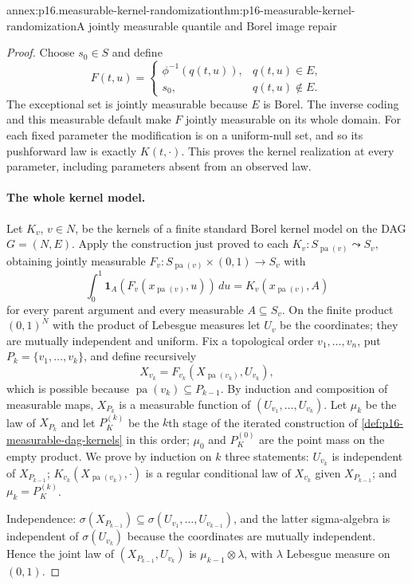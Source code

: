 \begin{annexitem}{annex:p16.measurable-kernel-randomization}{thm:p16-measurable-kernel-randomization}{A jointly measurable quantile and Borel image repair}
\begin{proof}
Choose \(s_0\in S\) and define
\[
 F(t,u)=\begin{cases}\phi^{-1}(q(t,u)),&q(t,u)\in E,\\
                         s_0,&q(t,u)\notin E.\end{cases}
\]
The exceptional set is jointly measurable because \(E\) is Borel.
The inverse coding and this measurable default make \(F\) jointly
measurable on its whole domain. For each fixed parameter the modification
is on a uniform-null set, and so its pushforward law is exactly
\(K(t,\cdot)\). This proves the kernel realization at every parameter,
including parameters absent from an observed law.

\paragraph{The whole kernel model.}
Let \(K_v\), \(v\in N\), be the kernels of a finite standard Borel
kernel model on the DAG \(G=(N,E)\). Apply the construction just
proved to each \(K_v:S_{\operatorname{pa}(v)}\leadsto S_v\), obtaining
jointly measurable \(F_v:S_{\operatorname{pa}(v)}\times(0,1)\to S_v\)
with
\[
 \int_0^1\mathbf 1_A(F_v(x_{\operatorname{pa}(v)},u))\,du
   =K_v(x_{\operatorname{pa}(v)},A)
\]
for every parent argument and every measurable \(A\subseteq S_v\).
On the finite product \((0,1)^N\) with the product of Lebesgue measures
let \(U_v\) be the coordinates; they are mutually independent and
uniform. Fix a topological order \(v_1,\ldots,v_n\), put
\(P_k=\{v_1,\ldots,v_k\}\), and define recursively
\[
 X_{v_k}=F_{v_k}(X_{\operatorname{pa}(v_k)},U_{v_k}),
\]
which is possible because \(\operatorname{pa}(v_k)\subseteq P_{k-1}\).
By induction and composition of measurable maps, \(X_{P_k}\) is a
measurable function of \((U_{v_1},\ldots,U_{v_k})\). Let
\(\mu_k\) be the law of \(X_{P_k}\) and let \(P_K^{(k)}\) be the
\(k\)th stage of the iterated construction of
\cref{def:p16-measurable-dag-kernels} in this order; \(\mu_0\) and
\(P_K^{(0)}\) are the point mass on the empty product. We prove by
induction on \(k\) three statements: \(U_{v_k}\) is independent of
\(X_{P_{k-1}}\); \(K_{v_k}(X_{\operatorname{pa}(v_k)},\cdot)\) is a
regular conditional law of \(X_{v_k}\) given \(X_{P_{k-1}}\); and
\(\mu_k=P_K^{(k)}\).

Independence: \(\sigma(X_{P_{k-1}})\subseteq
\sigma(U_{v_1},\ldots,U_{v_{k-1}})\), and the latter sigma-algebra is
independent of \(\sigma(U_{v_k})\) because the coordinates are mutually
independent. Hence the joint law of \((X_{P_{k-1}},U_{v_k})\) is
\(\mu_{k-1}\otimes\lambda\), with \(\lambda\) Lebesgue measure on
\((0,1)\).


\end{proof}
\end{annexitem}
